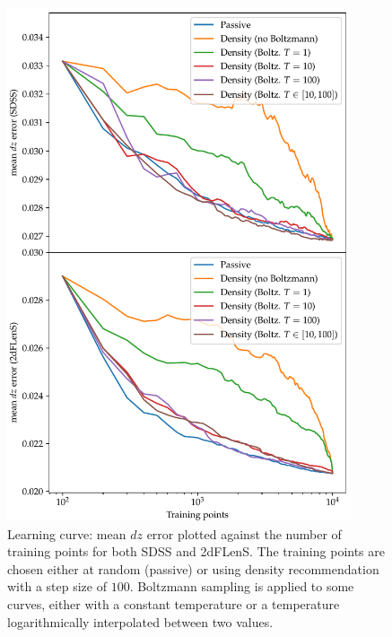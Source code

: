 \documentclass[11pt,twoside,openright]{report}
\begin{document}
  \begin{figure}
    \centering
    \includegraphics[width=0.9\textwidth]{boltz_density_dz1.pdf}
    \caption{Learning curve: mean $dz$ error plotted against the number of training points for both SDSS and 2dFLenS. The training points are chosen either at random (passive) or using density recommendation with a step size of $100$. Boltzmann sampling is applied to some curves, either with a constant temperature or a temperature logarithmically interpolated between two values.}
    \label{fig:boltz_density_dz1}
  \end{figure}
\end{document}
